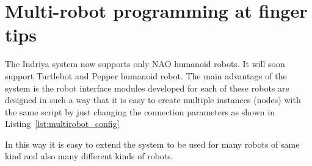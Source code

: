 
\section{Multi-robot programming at finger tips}
The Indriya system now supports only NAO humanoid robots. It will soon support Turtlebot and Pepper humanoid robot. The main advantage of the system is the robot interface modules developed for each of these robots are designed in such a way that it is easy to create multiple instances (nodes) with the same script by just changing the connection parameters as shown in Listing~\ref{lst:multirobot_config}

In this way it is easy to extend the system to be used for many robots of same kind and also many different kinds of robots. 
